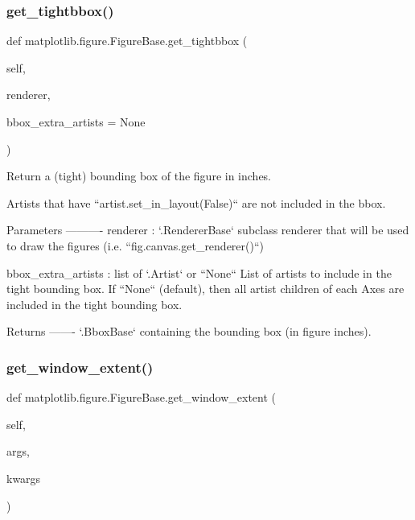 \begin{DoxyVerb}
\begin{DoxyVerb}
\subsubsection{\texorpdfstring{get\+\_\+tightbbox()}{get\_tightbbox()}}
{\footnotesize\ttfamily def matplotlib.\+figure.\+Figure\+Base.\+get\+\_\+tightbbox (\begin{DoxyParamCaption}\item[{}]{self,  }\item[{}]{renderer,  }\item[{}]{bbox\+\_\+extra\+\_\+artists = {\ttfamily None} }\end{DoxyParamCaption})}

\begin{DoxyVerb}Return a (tight) bounding box of the figure in inches.

Artists that have ``artist.set_in_layout(False)`` are not included
in the bbox.

Parameters
----------
renderer : `.RendererBase` subclass
    renderer that will be used to draw the figures (i.e.
    ``fig.canvas.get_renderer()``)

bbox_extra_artists : list of `.Artist` or ``None``
    List of artists to include in the tight bounding box.  If
    ``None`` (default), then all artist children of each Axes are
    included in the tight bounding box.

Returns
-------
`.BboxBase`
    containing the bounding box (in figure inches).
\end{DoxyVerb}
 \mbox{\label{classmatplotlib_1_1figure_1_1FigureBase_a2e5e6719b6231059c61e289c3b81609b}} 
\subsubsection{\texorpdfstring{get\+\_\+window\+\_\+extent()}{get\_window\_extent()}}
{\footnotesize\ttfamily def matplotlib.\+figure.\+Figure\+Base.\+get\+\_\+window\+\_\+extent (\begin{DoxyParamCaption}\item[{}]{self,  }\item[{}]{args,  }\item[{}]{kwargs }\end{DoxyParamCaption})}


\end{DoxyVerb}
\end{DoxyVerb}
